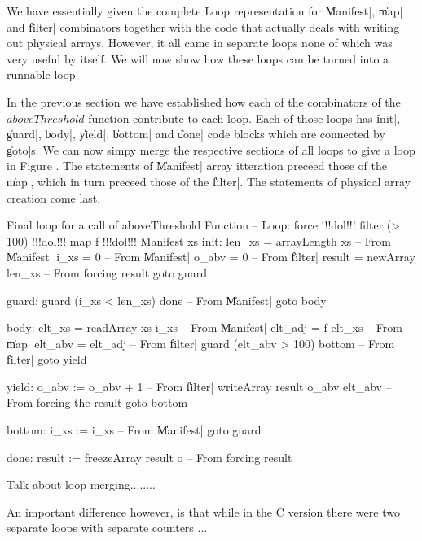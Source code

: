 \documentclass[preamble.tex]{subfiles}
\begin{document}
We have essentially given the complete Loop representation for \|Manifest|, \|map| and \|filter| combinators together with the code that actually deals with writing out physical arrays. However, it all came in separate loops none of which was very useful by itself. We will now show how these loops can be turned into a runnable loop.


In the previous section we have established how each of the combinators of the $aboveThreshold$ function contribute to each loop. Each of those loops has \|init|, \|guard|, \|body|, \|yield|, \|bottom| and \|done| code blocks which are connected by \|goto|s. We can now simpy merge the respective sections of all loops to give a loop in Figure . The statements of \|Manifest| array itteration preceed those of the \|map|, which in turn preceed those of the \|filter|. The statements of physical array creation come last.

\begin{loopcode2}{Final loop for a call of aboveThreshold Function%
\label{Listing:aboveThreshold-final-loop}}
  -- Loop: force !!!dol!!! filter (> 100) !!!dol!!! map f !!!dol!!! Manifest xs
  init:
    len_xs = arrayLength xs          -- From \|Manifest|
    i_xs = 0                         -- From \|Manifest|
    o_abv = 0                        -- From \|filter|
    result = newArray len_xs         -- From forcing result
    goto guard

  guard:
    guard (i_xs < len_xs) done       -- From \|Manifest|
    goto body

  body:
    elt_xs = readArray xs i_xs       -- From \|Manifest|
    elt_adj = f elt_xs               -- From \|map|
    elt_abv = elt_adj                -- From \|filter|     
    guard (elt_abv > 100) bottom     -- From \|filter|
    goto yield

  yield:
    o_abv := o_abv + 1               -- From \|filter|
    writeArray result o_abv elt_abv  -- From forcing the result
    goto bottom

  bottom:
    i_xs := i_xs                     -- From \|Manifest|
    goto guard

  done:
    result := freezeArray result o   -- From forcing result
\end{loopcode2}

Talk about loop merging........

An important difference however, is that while in the C version there were two separate loops with separate counters ...
\end{document}
